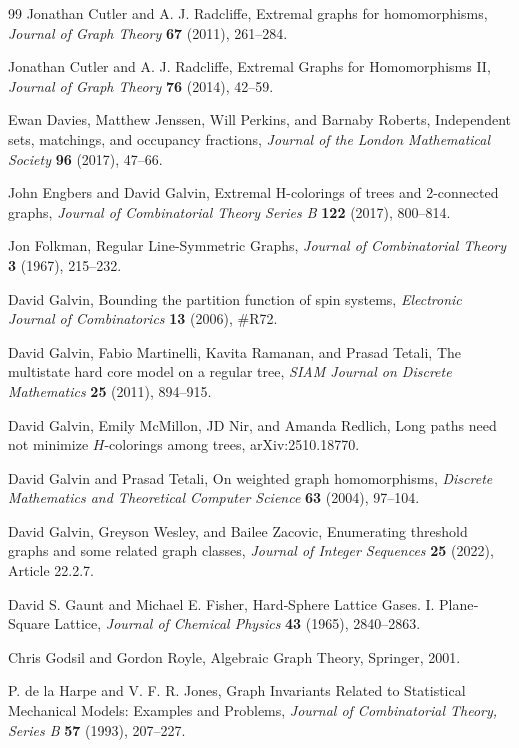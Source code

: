 \documentclass[11pt]{article}
\theoremstyle{definition}
\begin{document}
\begin{thebibliography}{99}
Jonathan Cutler and A. J. Radcliffe,  Extremal graphs for homomorphisms, {\it Journal of Graph Theory} {\bf 67} (2011), 261--284. 

Jonathan Cutler and A. J. Radcliffe, Extremal Graphs for Homomorphisms II, {\it Journal of Graph Theory} {\bf 76} (2014), 42--59.

Ewan Davies, Matthew Jenssen, Will Perkins, and Barnaby Roberts, Independent sets, matchings, and occupancy fractions, {\it Journal of the London Mathematical Society} {\bf 96} (2017), 47--66.

John Engbers and David Galvin, Extremal H-colorings of trees and 2-connected graphs, {\it Journal of Combinatorial Theory Series B} {\bf 122} (2017), 800--814.

Jon Folkman, Regular Line-Symmetric Graphs, {\it Journal of Combinatorial Theory} {\bf 3} (1967), 215--232.

David Galvin, Bounding the partition function of spin systems, {\it Electronic Journal of Combinatorics} {\bf 13} (2006), \#R72.

David Galvin, Fabio Martinelli, Kavita Ramanan, and Prasad Tetali, The multistate hard core model on a regular tree, {\it SIAM Journal on Discrete Mathematics} {\bf 25} (2011), 894--915.

 David Galvin, Emily McMillon, JD Nir, and Amanda Redlich, Long paths need not minimize $H$-colorings among trees, arXiv:2510.18770.

David Galvin and Prasad Tetali, On weighted graph homomorphisms, {\it Discrete Mathematics and Theoretical Computer Science} {\bf 63} (2004), 97--104.

David Galvin, Greyson Wesley, and Bailee Zacovic, Enumerating threshold graphs and some related graph classes, {\it Journal of Integer Sequences} {\bf 25} (2022), Article 22.2.7.

David S. Gaunt and Michael E. Fisher, Hard‐Sphere Lattice Gases. I. Plane‐Square Lattice, {\it Journal of Chemical Physics} {\bf 43} (1965), 2840--2863.

Chris Godsil and Gordon Royle, Algebraic Graph Theory, Springer, 2001.

P. de la Harpe and V. F. R. Jones, Graph Invariants Related to Statistical Mechanical Models: Examples and Problems, {\it  Journal of Combinatorial Theory, Series B} {\bf 57} (1993), 207--227.


\end{thebibliography}
\end{document}
